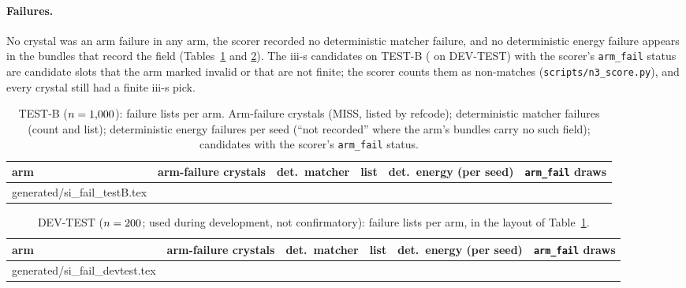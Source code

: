 \documentclass[journal=acsodf,manuscript=article]{achemso}
\makeatletter
\newcommand{\inputrows}[1]{\@@input #1 }
\newcommand{\devlabel}{DEV-TEST ($n=\svNDev$; used during development, not confirmatory)}
\makeatother
\begin{document}
\paragraph{Failures.} No crystal was an arm failure in any arm, the scorer recorded no
deterministic matcher failure, and no deterministic energy failure appears in the bundles that
record the field (Tables~\ref{tab:si_fail} and \ref{tab:si_fail_dev}). The \svIiisArmFail{} iii-s candidates on TEST-B (\svIiisArmFailDev{} on
DEV-TEST) with the scorer's \texttt{arm\_fail} status are candidate slots that the arm marked
invalid or that are not finite; the scorer counts them as non-matches
(\texttt{scripts/n3\_score.py}), and every crystal still had a finite iii-s pick.

\begin{table}[htbp]
\caption{TEST-B ($n=1{,}000$): failure lists per arm. Arm-failure crystals (MISS, listed by
refcode); deterministic matcher failures (count and list); deterministic energy failures per seed
(``not recorded'' where the arm's bundles carry no such field); candidates with the scorer's
\texttt{arm\_fail} status.}
\label{tab:si_fail}
\centering
\footnotesize
\begin{tabular}{@{}llrlll@{}}
\toprule
arm & arm-failure crystals & det.\ matcher & list & det.\ energy (per seed) & \texttt{arm\_fail} draws \\
\midrule
\inputrows{generated/si_fail_testB.tex}
\bottomrule
\end{tabular}
\end{table}

\begin{table}[htbp]
\caption{\devlabel: failure lists per arm, in the layout of Table~\ref{tab:si_fail}.}
\label{tab:si_fail_dev}
\centering
\footnotesize
\begin{tabular}{@{}llrlll@{}}
\toprule
arm & arm-failure crystals & det.\ matcher & list & det.\ energy (per seed) & \texttt{arm\_fail} draws \\
\midrule
\inputrows{generated/si_fail_devtest.tex}
\bottomrule
\end{tabular}
\end{table}
\end{document}
